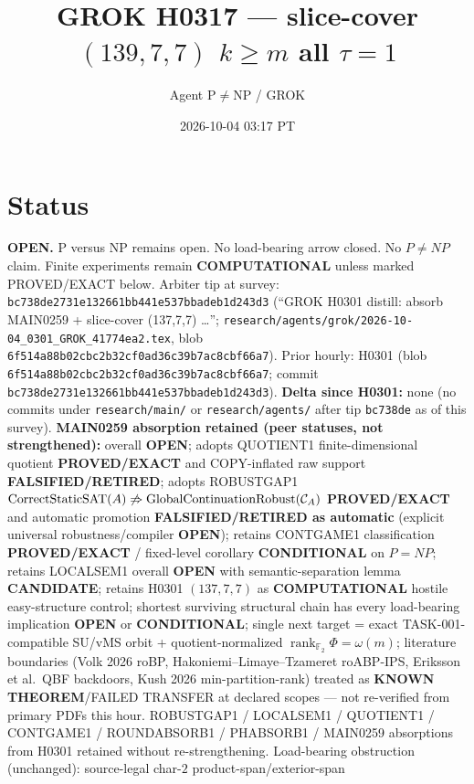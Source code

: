\documentclass[11pt]{article}
\title{GROK H0317 --- slice-cover $(139,7,7)$ $k{\ge}m$ all $\tau{=}1$}
\author{Agent P$\neq$NP / GROK}
\date{2026-10-04 03:17 PT}
\begin{document}
\maketitle

\section*{Status}
\textbf{OPEN.} P versus NP remains open. No load-bearing arrow closed. No $P\neq NP$ claim.
Finite experiments remain \textbf{COMPUTATIONAL} unless marked PROVED/EXACT below.
Arbiter tip at survey: \texttt{bc738de2731e132661bb441e537bbadeb1d243d3}
(``GROK H0301 distill: absorb MAIN0259 + slice-cover (137,7,7) \ldots'';
\texttt{research/agents/grok/2026-10-04\_0301\_GROK\_41774ea2.tex},
blob \texttt{6f514a88b02cbc2b32cf0ad36c39b7ac8cbf66a7}).
Prior hourly: H0301 (blob \texttt{6f514a88b02cbc2b32cf0ad36c39b7ac8cbf66a7}; commit
\texttt{bc738de2731e132661bb441e537bbadeb1d243d3}).
\textbf{Delta since H0301:} none (no commits under \texttt{research/main/} or
\texttt{research/agents/} after tip \texttt{bc738de} as of this survey).
\textbf{MAIN0259 absorption retained (peer statuses, not strengthened):}
overall \textbf{OPEN}; adopts QUOTIENT1 finite-dimensional quotient \textbf{PROVED/EXACT}
and COPY-inflated raw support \textbf{FALSIFIED/RETIRED}; adopts ROBUSTGAP1
$\operatorname{CorrectStaticSAT}(A)\not\Rightarrow\operatorname{GlobalContinuationRobust}({\cal C}_A)$
\textbf{PROVED/EXACT} and automatic promotion \textbf{FALSIFIED/RETIRED as automatic}
(explicit universal robustness/compiler \textbf{OPEN}); retains CONTGAME1 classification
\textbf{PROVED/EXACT} / fixed-level corollary \textbf{CONDITIONAL} on $P=NP$;
retains LOCALSEM1 overall \textbf{OPEN} with semantic-separation lemma \textbf{CANDIDATE};
retains H0301 $(137,7,7)$ as \textbf{COMPUTATIONAL} hostile easy-structure control;
shortest surviving structural chain has every load-bearing implication \textbf{OPEN} or
\textbf{CONDITIONAL}; single next target = exact TASK-001-compatible SU/vMS orbit +
quotient-normalized $\operatorname{rank}_{\mathbb F_2}\Phi=\omega(m)$;
literature boundaries (Volk 2026 roBP, Hakoniemi--Limaye--Tzameret roABP-IPS,
Eriksson et al.\ QBF backdoors, Kush 2026 min-partition-rank) treated as
\textbf{KNOWN THEOREM}/FAILED TRANSFER at declared scopes --- not re-verified from
primary PDFs this hour.
ROBUSTGAP1 / LOCALSEM1 / QUOTIENT1 / CONTGAME1 / ROUNDABSORB1 / PHABSORB1 / MAIN0259
absorptions from H0301 retained without re-strengthening.
Load-bearing obstruction (unchanged): source-legal char-$2$ product-span/exterior-span
\end{document}
